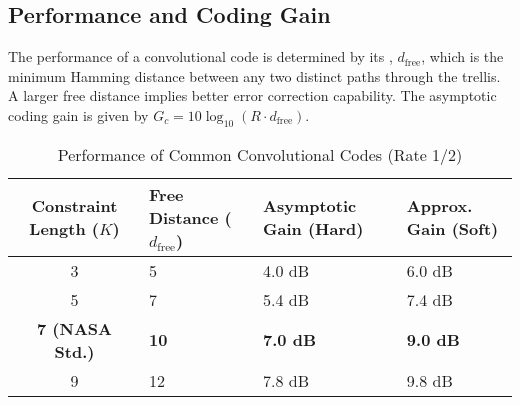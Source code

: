 \subsection{Performance and Coding Gain}

The performance of a convolutional code is determined by its , $d_{\text{free}}$, which is the minimum Hamming distance between any two distinct paths through the trellis. A larger free distance implies better error correction capability. The asymptotic coding gain is given by $G_c = 10\log_{10}(R \cdot d_{\text{free}})$.

\begin{table}[H]
    \centering
    \caption{Performance of Common Convolutional Codes (Rate 1/2)}
    \label{tab:conv-code-performance}
    \begin{tabularx}{\textwidth}{@{}cXXX@{}}
        \toprule
        \tableheaderfont Constraint Length ($K$) & \tableheaderfont Free Distance ($d_{\text{free}}$) & \tableheaderfont Asymptotic Gain (Hard) & \tableheaderfont Approx. Gain (Soft) \\
        \midrule
        3 & 5 & 4.0 dB & 6.0 dB \\
        5 & 7 & 5.4 dB & 7.4 dB \\
        \textbf{7 (NASA Std.)} & \textbf{10} & \textbf{7.0 dB} & \textbf{9.0 dB} \\
        9 & 12 & 7.8 dB & 9.8 dB \\
        \bottomrule
    \end{tabularx}
\end{table}


